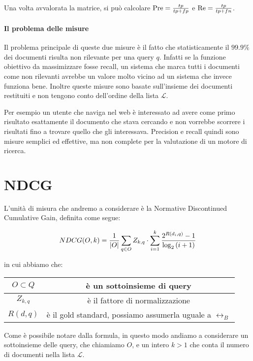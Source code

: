 Una volta avvalorata la matrice, si può calcolare $\text{Pre} = \frac{tp}{tp + fp}$ e $\text{Re} = \frac{tp}{tp + fn}$.

\paragraph{Il problema delle misure}
Il problema principale di queste due misure è il fatto che statisticamente il $99.9\%$\cite{irbook} dei documenti
risulta non rilevante per una query $q$. 
Infatti se la funzione obiettivo da massimizzare fosse recall,
un sistema che marca tutti i documenti come non rilevanti avrebbe
un valore molto vicino ad un sistema che invece funziona bene. Inoltre
queste misure sono basate sull'insieme dei documenti restituiti e non tengono
conto dell'ordine della lista $\mathcal{L}$.

Per esempio un utente che naviga nel web è interessato
ad avere come primo risultato esattamente il documento che stava cercando
e non vorrebbe scorrere i risultati fino a trovare quello che gli interessava.
Precision e recall quindi sono misure semplici ed effettive, ma non
complete per la valutazione di un motore di ricerca.

\section{NDCG}
L'unità di misura che andremo a considerare è la Normative Discontinued Cumulative Gain,
definita come segue:

$$\label{def:ndcg}
NDCG(O, k) = \frac{1}{\left|O\right|} \sum_{q \in O} Z_{k, q} \cdot \sum_{i=1}^{k} \frac{2^{R(d_i, q)} - 1}{\log_2{(i + 1)}} \\
$$

in cui abbiamo che:
\begin{table}[h!]
	\centering
	\begin{tabular}{|c|c|}
		\hline
		$ O \subset Q$ & è un sottoinsieme di query \\
		\hline
		$Z_{k,q}$ & è il fattore di normalizzazione \\
		\hline
		$R(d,q)$ & è il gold standard, possiamo assumerla uguale a $\rel_B$ \\
		\hline
	\end{tabular}
\end{table}

Come è possibile notare dalla formula, in questo modo andiamo a considerare un sottoinsieme delle query, che chiamiamo $O$,
e un intero $k>1$ che conta il numero di documenti nella lista $\mathcal{L}$.

